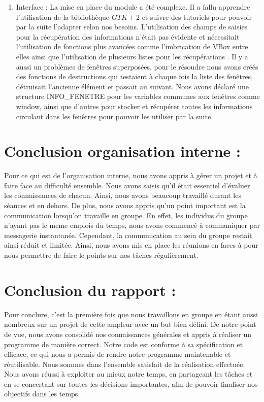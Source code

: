 \documentclass{article}
\begin{document}
\begin{enumerate}
			\item Interface :
			 La mise en place du module a été complexe. Il a fallu apprendre l'utilisation de la bibliothèque $GTK+2$ et suivre des tutoriels pour pouvoir par la suite l'adapter selon nos besoins.  L'utilisation des champs de saisies  pour la récupération des informations n'était pas évidente et nécessitait l'utilisation de fonctions plus avancées comme l'imbrication de VBox entre elles ainsi que l'utilisation de plusieurs listes pour les récupérations . 
Il y a aussi un problèmes de fenêtres superposées,  pour le résoudre nous avons créés des fonctions de destructions qui testaient à chaque fois la liste des fenêtres, détruisait l'ancienne élément et passait au suivant.
Nous avons déclaré une structure INFO\_FENETRE pour les variables communes aux fenêtres comme window, ainsi que d'autres pour stocker et récupérer toutes les informations circulant dans les fenêtres pour pouvoir les utiliser par la suite.      
	\end{enumerate}

\section{Conclusion organisation interne :}
Pour ce qui est de l’organisation interne, nous avons appris à gérer un projet et à faire face au difficulté ensemble. 
Nous avons saisis qu’il était essentiel d’évaluer les connaissances de chacun. Ainsi, nous avons beaucoup travaillé durant les séances et en dehors.  De plus, nous avons appris qu’un point important est la communication lorsqu’on travaille en groupe. En effet, les individus du groupe n’ayant pas le meme emplois du temps, nous avons commencé à communiquer par messagerie instantanée. Cependant, la communication au sein du groupe restait ainsi réduit et limitée. Ainsi, nous avons mis en place les réunions en faces à  pour nous permettre de faire le points sur nos tâches régulièrement. 

\section{Conclusion du rapport :}
Pour conclure, c'est la première fois que nous travaillons en groupe en étant aussi nombreux sur un projet de cette ampleur avec un but bien défini. De notre point de vue, nous avons consolidé nos connaissances générales et appris à réaliser un programme de manière correct. 
Notre code est conforme à sa spécification et efficace, ce qui nous a permis de rendre notre programme maintenable et réutilisable. 
Nous sommes dans l'ensemble satisfait de la réalisation effectuée. Nous avons réussi à exploiter au mieux notre temps, en partageant les tâches et en se concertant sur toutes les décisions importantes, afin de pouvoir finaliser nos objectifs dans les temps.
\end{document}
